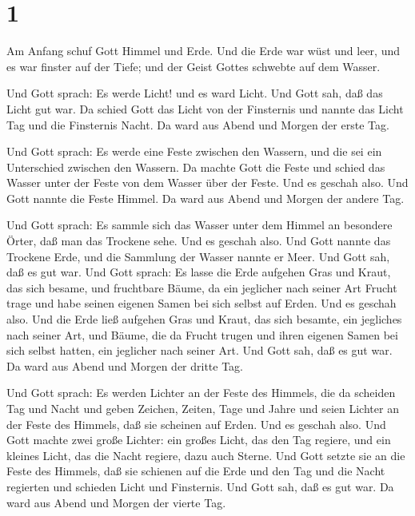 \hypertarget{section}{%
\section{1}\label{section}}

 Am Anfang schuf Gott Himmel und Erde.  Und die
Erde war wüst und leer, und es war finster auf der Tiefe; und der Geist
Gottes schwebte auf dem Wasser.

 Und Gott sprach: Es werde Licht! und es ward Licht.
 Und Gott sah, daß das Licht gut war. Da schied Gott das
Licht von der Finsternis  und nannte das Licht Tag und die
Finsternis Nacht. Da ward aus Abend und Morgen der erste Tag.

 Und Gott sprach: Es werde eine Feste zwischen den Wassern,
und die sei ein Unterschied zwischen den Wassern.  Da machte
Gott die Feste und schied das Wasser unter der Feste von dem Wasser über
der Feste. Und es geschah also.  Und Gott nannte die Feste
Himmel. Da ward aus Abend und Morgen der andere Tag.

 Und Gott sprach: Es sammle sich das Wasser unter dem Himmel
an besondere Örter, daß man das Trockene sehe. Und es geschah also.
 Und Gott nannte das Trockene Erde, und die Sammlung der
Wasser nannte er Meer. Und Gott sah, daß es gut war.  Und
Gott sprach: Es lasse die Erde aufgehen Gras und Kraut, das sich besame,
und fruchtbare Bäume, da ein jeglicher nach seiner Art Frucht trage und
habe seinen eigenen Samen bei sich selbst auf Erden. Und es geschah
also.  Und die Erde ließ aufgehen Gras und Kraut, das sich
besamte, ein jegliches nach seiner Art, und Bäume, die da Frucht trugen
und ihren eigenen Samen bei sich selbst hatten, ein jeglicher nach
seiner Art. Und Gott sah, daß es gut war.  Da ward aus
Abend und Morgen der dritte Tag.

 Und Gott sprach: Es werden Lichter an der Feste des
Himmels, die da scheiden Tag und Nacht und geben Zeichen, Zeiten, Tage
und Jahre  und seien Lichter an der Feste des Himmels, daß
sie scheinen auf Erden. Und es geschah also.  Und Gott
machte zwei große Lichter: ein großes Licht, das den Tag regiere, und
ein kleines Licht, das die Nacht regiere, dazu auch Sterne.
 Und Gott setzte sie an die Feste des Himmels, daß sie
schienen auf die Erde  und den Tag und die Nacht regierten
und schieden Licht und Finsternis. Und Gott sah, daß es gut war.
 Da ward aus Abend und Morgen der vierte Tag.

